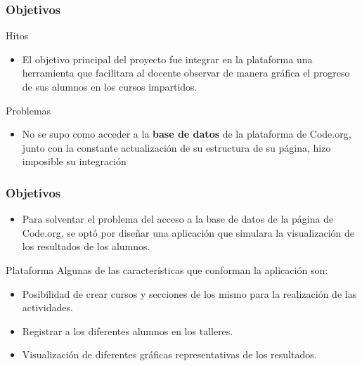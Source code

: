 \documentclass{beamer}
\begin{document}
\begin{frame}

\frametitle{Objetivos }

\begin{block}{Hitos}
  \begin{itemize}
  \item
   El objetivo principal del proyecto fue integrar en la plataforma una herramienta que facilitara al docente observar de manera gráfica el progreso de sus alumnos
   en los cursos impartidos.

  \end{itemize}
\end{block}

\begin{alertblock}{Problemas}
    \begin{itemize}
        \item No se supo como acceder a la \textbf{base de datos} de la plataforma de Code.org, junto con la constante actualización de su estructura de su página, hizo imposible su integración
    \end{itemize}
\end{alertblock}

\end{frame}
\begin{frame}

\frametitle{Objetivos }

\begin{itemize}
\item
Para solventar el problema del acceso a la base de datos de la página de Code.org, se optó por diseñar una aplicación que simulara la visualización de los resultados
de los alumnos.
\end{itemize}

\begin{block}{Plataforma}
    Algunas de las características que conforman la aplicación son:
    \begin{itemize}
        \item Posibilidad de crear cursos y secciones de los mismo para la realización de las actividades.
        \item Registrar a los diferentes alumnos en los talleres.
        \item Visualización de diferentes gráficas representativas de los resultados.
    \end{itemize}
\end{block}

\end{frame}
\end{document}
